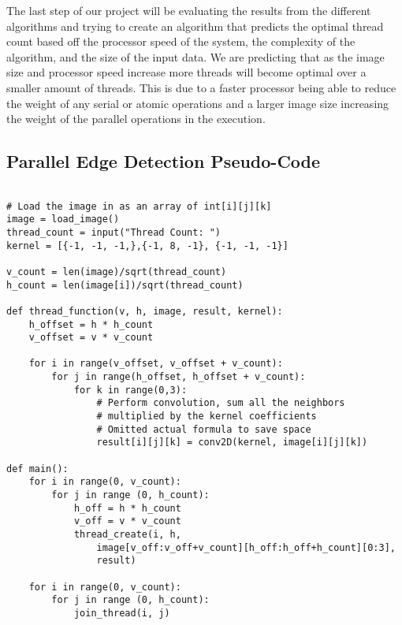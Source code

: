 \documentclass{article}
\begin{document}
        The last step of our project will be evaluating the results from the different algorithms and trying to create an algorithm that predicts the optimal thread count based off the processor speed of the system, the complexity of the algorithm, and the size of the input data.  We are predicting that as the image size and processor speed increase more threads will become optimal over a smaller amount of threads.  This is due to a faster processor being able to reduce the weight of any serial or atomic operations and a larger image size increasing the weight of the parallel operations in the execution.
        \pagebreak
        
        \subsection{Parallel Edge Detection Pseudo-Code}
        \begin{lstlisting}[basicstyle=\footnotesize]

# Load the image in as an array of int[i][j][k]
image = load_image()
thread_count = input("Thread Count: ")
kernel = [{-1, -1, -1,},{-1, 8, -1}, {-1, -1, -1}]

v_count = len(image)/sqrt(thread_count)
h_count = len(image[i])/sqrt(thread_count)

def thread_function(v, h, image, result, kernel):
    h_offset = h * h_count
    v_offset = v * v_count
    
    for i in range(v_offset, v_offset + v_count):
        for j in range(h_offset, h_offset + v_count):
            for k in range(0,3):
                # Perform convolution, sum all the neighbors 
                # multiplied by the kernel coefficients
                # Omitted actual formula to save space
                result[i][j][k] = conv2D(kernel, image[i][j][k])

def main():
    for i in range(0, v_count):
        for j in range (0, h_count):
            h_off = h * h_count
            v_off = v * v_count
            thread_create(i, h, 
                image[v_off:v_off+v_count][h_off:h_off+h_count][0:3], 
                result)
                
    for i in range(0, v_count):
        for j in range (0, h_count):
            join_thread(i, j)

        \end{lstlisting}
        \pagebreak       
        
\end{document}
